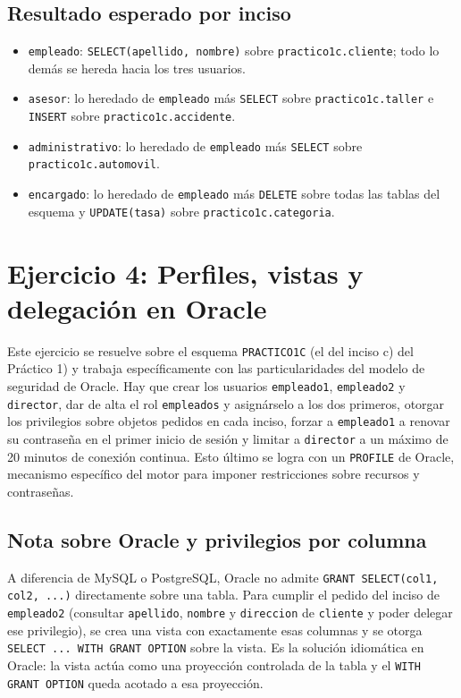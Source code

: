 \documentclass[11pt,a4paper]{article}
\begin{document}
\subsection{Resultado esperado por inciso}

\begin{itemize}
    \item \texttt{empleado}: \texttt{SELECT(apellido, nombre)} sobre \texttt{practico1c.cliente}; todo lo demás se hereda hacia los tres usuarios.
    \item \texttt{asesor}: lo heredado de \texttt{empleado} más \texttt{SELECT} sobre \texttt{practico1c.taller} e \texttt{INSERT} sobre \texttt{practico1c.accidente}.
    \item \texttt{administrativo}: lo heredado de \texttt{empleado} más \texttt{SELECT} sobre \texttt{practico1c.automovil}.
    \item \texttt{encargado}: lo heredado de \texttt{empleado} más \texttt{DELETE} sobre todas las tablas del esquema y \texttt{UPDATE(tasa)} sobre \texttt{practico1c.categoria}.
\end{itemize}

\section{Ejercicio 4: Perfiles, vistas y delegación en Oracle}

Este ejercicio se resuelve sobre el esquema \texttt{PRACTICO1C} (el del inciso c) del Práctico 1) y trabaja específicamente con las particularidades del modelo de seguridad de Oracle. Hay que crear los usuarios \texttt{empleado1}, \texttt{empleado2} y \texttt{director}, dar de alta el rol \texttt{empleados} y asignárselo a los dos primeros, otorgar los privilegios sobre objetos pedidos en cada inciso, forzar a \texttt{empleado1} a renovar su contraseña en el primer inicio de sesión y limitar a \texttt{director} a un máximo de 20 minutos de conexión continua. Esto último se logra con un \texttt{PROFILE} de Oracle, mecanismo específico del motor para imponer restricciones sobre recursos y contraseñas.

\subsection{Nota sobre Oracle y privilegios por columna}

A diferencia de MySQL o PostgreSQL, Oracle no admite \texttt{GRANT SELECT(col1, col2, ...)} directamente sobre una tabla. Para cumplir el pedido del inciso de \texttt{empleado2} (consultar \texttt{apellido}, \texttt{nombre} y \texttt{direccion} de \texttt{cliente} y poder delegar ese privilegio), se crea una vista con exactamente esas columnas y se otorga \texttt{SELECT ... WITH GRANT OPTION} sobre la vista. Es la solución idiomática en Oracle: la vista actúa como una proyección controlada de la tabla y el \texttt{WITH GRANT OPTION} queda acotado a esa proyección.
\end{document}
